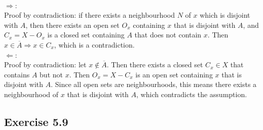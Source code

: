 \begin{solution}
 \\$\Rightarrow$: \\
 Proof by contradiction: if there exists a neighbourhood $N$ of $x$ which is disjoint with $A$, then there exists an open set $O_x$ containing $x$ that is disjoint with $A$, and $C_x = X - O_x$ is a closed set containing $A$ that does not contain $x$. Then $x \in \overline{A} \Rightarrow x \in C_x$, which is a contradiction. \\
 $\Leftarrow$: \\
 Proof by contradiction: let $x \notin \overline{A}$. Then there exists a closed set $C_x \in X$ that contains $A$ but not $x$. Then $O_x = X - C_x$ is an open set containing $x$ that is disjoint with $A$. Since all open sets are neighbourhoods, this means there exists a neighbourhood of $x$ that is disjoint with $A$, which contradicts the assumption.
\end{solution}

\subsection{Exercise 5.9}
\setcounter{question}{0}


